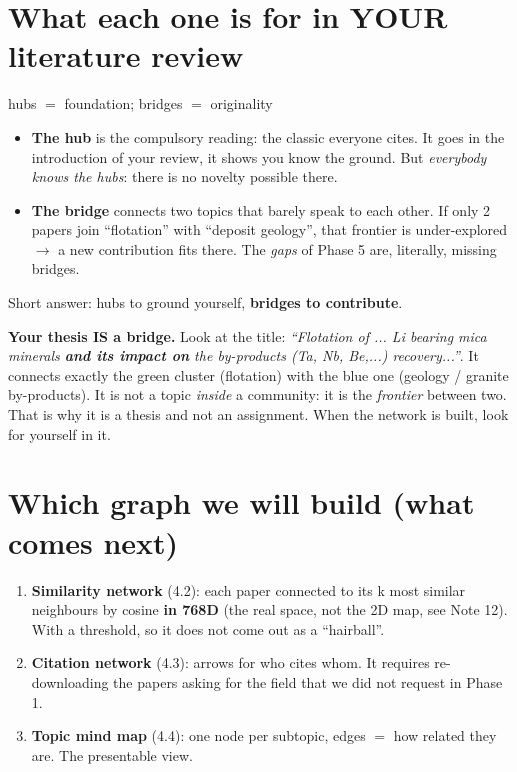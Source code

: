 \documentclass[11pt,a4paper]{article}
\begin{document}
\section{What each one is for in YOUR literature review}

\begin{concepto}{hubs $=$ foundation; bridges $=$ originality}
\begin{itemize}
  \item \textbf{The hub} is the compulsory reading: the classic everyone cites. It goes in the
        introduction of your review, it shows you know the ground. But \emph{everybody knows
        the hubs}: there is no novelty possible there.
  \item \textbf{The bridge} connects two topics that barely speak to each other. If only 2
        papers join ``flotation'' with ``deposit geology'', that frontier is under-explored
        $\rightarrow$ a new contribution fits there. The \emph{gaps} of Phase 5 are, literally,
        missing bridges.
\end{itemize}
Short answer: hubs to ground yourself, \textbf{bridges to contribute}.
\end{concepto}

\begin{ojo}
\textbf{Your thesis IS a bridge.} Look at the title: \emph{``Flotation of ... Li bearing mica
minerals \textbf{and its impact on} the by-products (Ta, Nb, Be,...) recovery...''}. It
connects exactly the green cluster (flotation) with the blue one (geology / granite
by-products). It is not a topic \emph{inside} a community: it is the \emph{frontier} between
two. That is why it is a thesis and not an assignment. When the network is built, look for
yourself in it.
\end{ojo}

\section{Which graph we will build (what comes next)}

\begin{enumerate}
  \item \textbf{Similarity network} (4.2): each paper connected to its k most similar
        neighbours by cosine \textbf{in 768D} (the real space, not the 2D map, see Note 12).
        With a threshold, so it does not come out as a ``hairball''.
  \item \textbf{Citation network} (4.3): arrows for who cites whom. It requires re-downloading
        the papers asking for the  field that we did not request in
        Phase 1.
  \item \textbf{Topic mind map} (4.4): one node per subtopic, edges $=$ how related they are.
        The presentable view.
\end{enumerate}
\end{document}
